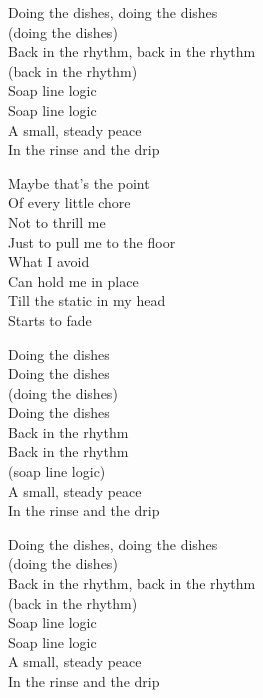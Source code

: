 \begin{lyrics}
Doing the dishes, doing the dishes\\
(doing the dishes)\\
Back in the rhythm, back in the rhythm\\
(back in the rhythm)\\
Soap line logic\\
Soap line logic\\
A small, steady peace\\
In the rinse and the drip

Maybe that’s the point\\
Of every little chore\\
Not to thrill me\\
Just to pull me to the floor\\
What I avoid\\
Can hold me in place\\
Till the static in my head\\
Starts to fade

Doing the dishes\\
Doing the dishes\\
(doing the dishes)\\
Doing the dishes\\
Back in the rhythm\\
Back in the rhythm\\
(soap line logic)\\
A small, steady peace\\
In the rinse and the drip

Doing the dishes, doing the dishes\\
(doing the dishes)\\
Back in the rhythm, back in the rhythm\\
(back in the rhythm)\\
Soap line logic\\
Soap line logic\\
A small, steady peace\\
In the rinse and the drip

\end{lyrics}

